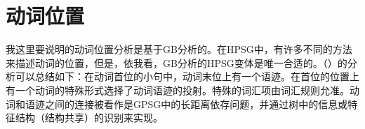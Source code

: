\section{动词位置}
\label{Abschnitt-Verbstellung-HPSG}

我这里要说明的动词位置分析是基于GB分析的。在HPSG中，有许多不同的方法来描述动词的位置，但是，依我看，GB分析的HPSG变体是唯一合适的\citep{Mueller2005c,Mueller2005d,MuellerGS}。（）的分析可以总结如下：在动词首位的小句中，动词末位上有一个语迹。在首位的位置上有一个动词的特殊形式选择了动词语迹的投射。特殊的词汇项由词汇规则允准。动词和语迹之间的连接被看作是GPSG中的长距离依存问题，并通过树中的信息或特征结构（结构共享）的识别来实现。

